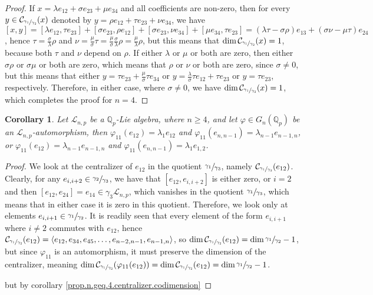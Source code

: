\documentclass[12pt]{article}
\newtheorem{corollary}[theorem]{Corollary}
\begin{document}
\begin{proof}
If $x=\lambda e_{12}+\sigma e_{23}+\mu e_{34}$ and all coefficients are non-zero, then for every $y\in\mathcal{C}_{\sfrac{\gamma_1}{\gamma_2}}(x)$ denoted by $y=\rho e_{12}+\tau e_{23}+\nu e_{34}$, we have $[x,y]=[\lambda e_{12},\tau e_{23}]+[\sigma e_{23},\rho e_{12}]+[\sigma e_{23},\nu e_{34}]+[\mu e_{34},\tau e_{23}]=(\lambda\tau-\sigma\rho)e_{13}+(\sigma\nu-\mu\tau)e_{24}$, hence $\tau=\frac{\sigma}{\lambda}\rho$ and $\nu=\frac{\mu}{\sigma}\tau=\frac{\mu}{\sigma}\frac{\sigma}{\lambda}\rho=\frac{\mu}{\lambda}\rho$, but this means that $\dim\mathcal{C}_{\sfrac{\gamma_1}{\gamma_2}}(x)=1$, because both $\tau$ and $\nu$ depend on $\rho$. If either $\lambda$ or $\mu$ or both are zero, then either $\sigma\rho$ or $\sigma\mu$ or both are zero, which means that $\rho$ or $\nu$ or both are zero, since $\sigma\neq 0$, but this means that either $y=\tau e_{23}+\frac{\mu}{\sigma}\tau e_{34}$ or $y=\frac{\lambda}{\sigma}\tau e_{12}+\tau e_{23}$ or $y=\tau e_{23}$, respectively. Therefore, in either case, where $\sigma\neq 0$, we have $\dim\mathcal{C}_{\sfrac{\gamma_1}{\gamma_2}}(x)=1$, which completes the proof for $n=4$.
\end{proof}
\begin{corollary}
Let $\mathcal{L}_{n,p}$ be a $\mathbb{Q}_p$-Lie algebra, where $n\geq 4$, and let $\varphi\in G_n(\mathbb{Q}_p)$ be an $\mathcal{L}_{n,p}$-automorphism, then
$\varphi_{11}(e_{12})=\lambda_1 e_{12}$ and $\varphi_{11}(e_{n,n-1})=\lambda_{n-1}e_{n-1,n}$, or $\varphi_{11}(e_{12})=\lambda_{n-1} e_{n-1,n}$ and $\varphi_{11}(e_{n,n-1})=\lambda_1 e_{1,2}$.
\end{corollary}
\begin{proof}
We look at the centralizer of $e_{12}$ in the quotient $\sfrac{\gamma_1}{\gamma_3}$, namely $\mathcal{C}_{\sfrac{\gamma_1}{\gamma_3}}(e_{12})$. Clearly, for any $e_{i,i+2}\in\sfrac{\gamma_2}{\gamma_3}$, we have that $[e_{12},e_{i,i+2}]$ is either zero, or $i=2$ and then $[e_{12},e_{24}]=e_{14}\in\gamma_3\mathcal{L}_{n,p}$, which vanishes in the quotient $\sfrac{\gamma_1}{\gamma_3}$, which means that in either case it is zero in this quotient. Therefore, we look only at elements $e_{i,i+1}\in\sfrac{\gamma_1}{\gamma_2}$. It is readily seen that every element of the form $e_{i,i+1}$ where $i\neq 2$ commutes with $e_{12}$, hence $\mathcal{C}_{\sfrac{\gamma_1}{\gamma_2}}(e_{12})=\langle e_{12},e_{34},e_{45},\dots,e_{n-2,n-1},e_{n-1,n}\rangle$, so $\dim\mathcal{C}_{\sfrac{\gamma_1}{\gamma_2}}(e_{12})=\dim\sfrac{\gamma_1}{\gamma_2}-1$, but since $\varphi_{11}$ is an automorphism, it must preserve the dimension of the centralizer, meaning $\dim\mathcal{C}_{\sfrac{\gamma_1}{\gamma_2}}(\varphi_{11}(e_{12}))=\dim\mathcal{C}_{\sfrac{\gamma_1}{\gamma_2}}(e_{12})=\dim\sfrac{\gamma_1}{\gamma_2}-1$.



but by corollary \ref{prop.n.geq.4.centralizer.codimension}
\end{proof}
\end{document}
